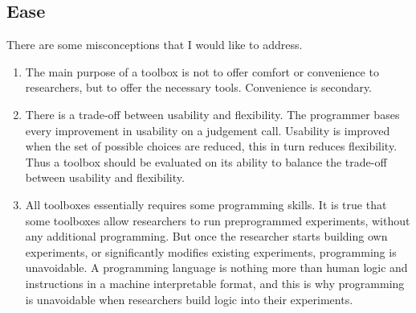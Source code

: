 \documentclass[preprint, 12pt]{elsarticle}
\begin{document}
\subsection{Ease}

There are some misconceptions that I would like to address. 
\begin{enumerate}
\item The main purpose of a toolbox is not to offer comfort or convenience to researchers, but to offer the necessary tools. Convenience is secondary.
\item There is a trade-off between usability and flexibility. The programmer bases every improvement in usability on a judgement call. Usability is improved when the set of possible choices are reduced, this in turn reduces flexibility. Thus a toolbox should be evaluated on its ability to balance the trade-off between usability and flexibility. 
\item All toolboxes essentially requires some programming skills. It is true that some toolboxes allow researchers to run preprogrammed experiments, without any additional programming. But once the researcher starts building own experiments, or significantly modifies existing experiments, programming is unavoidable. A programming language is nothing more than human logic and instructions in a machine interpretable format, and this is why programming is unavoidable when researchers build logic into their experiments.
\end{enumerate}
\end{document}

